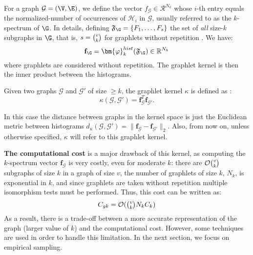 For a graph $\mathcal{G}=(\V,\E)$, we define the vector $f_\mathcal{G}\in \mathcal{R}^{N_k}$  whose $i$-th entry equals the normalized-number of occurrences of $\mathcal{H}_i$ in $\mathcal{G}$, usually referred to as the $k$-spectrum of $\G$. In details, defining $\mathfrak{F}_\G=\{F_1,\ldots,F_s\}$ the set of \emph{all} size-$k$ subgraphs in $\G$, that is, $s=\tbinom{v}{k}$ for graphlets without repetition . We have:
\[
\mathbf{f}_\G=\bm{\varphi}_k^{hist}(\mathfrak{F}_\G) \in\mathbb{R}^{N_k}
\]
where graphlets are considered without repetition. The graphlet kernel is then the inner product between the histograms.
\begin{definition}
Given two graphs $\mathcal{G}$ and $\mathcal{G}'$ of size $\geq k$, the graphlet kernel $\kappa$ is defined as \citep{graphlet_kernel}:
\begin{equation}
\label{eq:graphlet_kernel}
    \kappa(\mathcal{G},\mathcal{G}')=\mathbf{f}_{\mathcal{G}}^T \mathbf{f}_{\mathcal{G}'}.
\end{equation}
\end{definition}
In this case the distance between graphs in the kernel space is just the Euclidean metric between histograms $d_\kappa({\mathcal{G}},{\mathcal{G}'}) = \|\mathbf{f}_{\mathcal{G}} - \mathbf{f}_{{\mathcal{G}'}}\|_2$. Also, from now on, unless otherwise specified, $\kappa$ will refer to this graphlet kernel. 

\textbf{The computational cost} is a major drawback of this kernel, as computing the $k$-spectrum vector $\mathbf{f}_{\mathcal{G}}$ is very costly, even for moderate $k$: there are $\mathcal{O}\tbinom{v}{k}$ subgraphs of size $k$ in a graph of size $v$, the number of graphlets of size $k$, $N_k$, is exponential in $k$, and since graphlets are taken without repetition multiple isomorphism tests must be performed. Thus, this cost can be written as:
\begin{equation}
\label{eq:cost_graphlet}
    C_{gk}= \mathcal{O}(\tbinom{v}{k} N_k C_k)
\end{equation}
As a result, there is a trade-off between a more accurate representation of the graph (larger value of $k$) and the computational cost. However, some techniques are used in order to handle this limitation. In the next section, we focus on empirical sampling.


